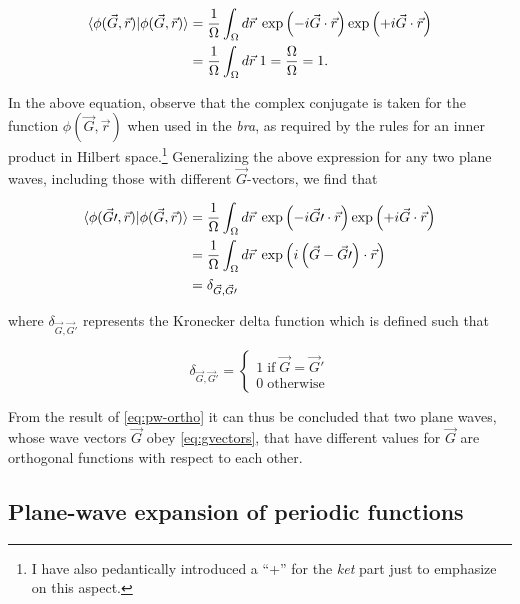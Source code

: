 \begin{align}
    \braket{\phi(\vec{G},\vec{r}) | \phi(\vec{G},\vec{r})} &= \frac{1}{\Omega} \int_{\Omega} d \vec{r} \;\exp \left(-i \vec{G} \cdot \vec{r} \right) \exp \left(+i \vec{G} \cdot \vec{r} \right) \\
    &= \frac{1}{\Omega} \int_{\Omega} d \vec{r} \; 1 = \frac{\Omega}{\Omega} = 1. \\
\end{align}

In the above equation, observe that the complex conjugate is taken for the function $\phi(\vec{G},\vec{r})$ when used in the \textit{bra}, as required by the rules for an inner product in Hilbert space.\footnote{I have also pedantically introduced a ``+'' for the \textit{ket} part just to emphasize on this aspect.} Generalizing the above expression for any two plane waves, including those with different $\vec{G}$-vectors, we find that

\begin{align}
    \braket{\phi(\vec{G}\prime,\vec{r}) | \phi(\vec{G},\vec{r})} &= \frac{1}{\Omega} \int_{\Omega} d \vec{r} \; \exp\left(-i \vec{G}\prime \cdot \vec{r} \right) \exp\left(+i \vec{G} \cdot \vec{r} \right) \\
    &= \frac{1}{\Omega} \int_{\Omega} d \vec{r} \; \exp\left(i \left(\vec{G} - \vec{G}\prime \right) \cdot \vec{r} \right) \\
    &= \delta_{\vec{G},\vec{G}\prime} \label{eq:pw-ortho}
\end{align}

where $\delta_{\vec{G},\vec{G}\prime}$ represents the Kronecker delta function which is defined such that

\begin{equation}
    \delta_{\vec{G},\vec{G}\prime} =
    \begin{cases}
    1\; \text{if}\; \vec{G} = \vec{G}\prime \\
    0\; \text{otherwise}
    \end{cases}
\end{equation}

From the result of \cref{eq:pw-ortho} it can thus be concluded that two plane waves, whose wave vectors $\vec{G}$ obey \cref{eq:gvectors}, that have different values for $\vec{G}$ are orthogonal functions with respect to each other.

%
%
%
\subsection{Plane-wave expansion of periodic functions}


